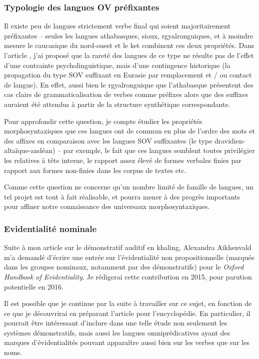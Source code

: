 \documentclass[oldfontcommands,oneside,a4paper,11pt]{article}
\begin{document}
 
  \subsubsection{Typologie des langues OV préfixantes} 
 Il existe peu de langues strictement verbe final qui soient majoritairement préfixantes -- seules les langues athabasques, sioux, rgyalronguiques, et à moindre mesure le caucasique du nord-ouest et le ket combinent ces deux propriétés. Dans l'article  \citet{jacques13harmonization}, j'ai proposé que la rareté des langues de ce type ne résulte pas de l'effet d'une contrainte psycholinguistique, mais d'une contingence historique (la propagation du type SOV suffixant en Eurasie par remplacement et / ou contact de langue).  En effet, aussi bien le rgyalronguique que l'athabasque présentent des cas clairs de grammaticalisation de verbes comme préfixes alors que des suffixes auraient été attendus à partir de la structure synthétique correspondante.
 
Pour approfondir cette question, je compte étudier les propriétés morphosyntaxiques que ces langues ont de commun en plus de l'ordre des mots et des affixes en comparaison avec les langues SOV suffixantes (le type dravidien-altaïque-andéan) -- par exemple, le fait que ces langues semblent toutes privilégier les relatives à tête interne, le rapport assez élevé de formes verbales finies par rapport aux formes non-finies dans les corpus de textes etc. 

Comme cette question ne concerne qu'un nombre limité de famille de langues, un tel projet est tout à fait réalisable, et pourra mener à des progrès importants pour affiner notre connaissance des universaux morphosyntaxiques.

\subsubsection{Evidentialité nominale}
Suite à mon article \citet{jacques14auditory} sur le démonstratif auditif en khaling, Alexandra Aikhenvald m'a demandé d'écrire une entrée sur l'évidentialité non propositionnelle (marquée dans les groupes nominaux, notamment par des démonstratifs) pour le \textit{Oxford Handbook of Evidentiality}. Je rédigerai cette contribution en 2015, pour parution potentielle en 2016.

Il est possible que je continue par la suite à travailler sur ce sujet, en fonction de ce que je découvrirai en préparant l'article pour l'encyclopédie. En particulier, il pourrait être intéressant d'inclure dans une telle étude non seulement les systèmes démonstratifs, mais aussi les langues omniprédicatives ayant des marques d'évidentialités pouvant apparaître aussi bien sur les verbes que sur les noms.
\end{document}
